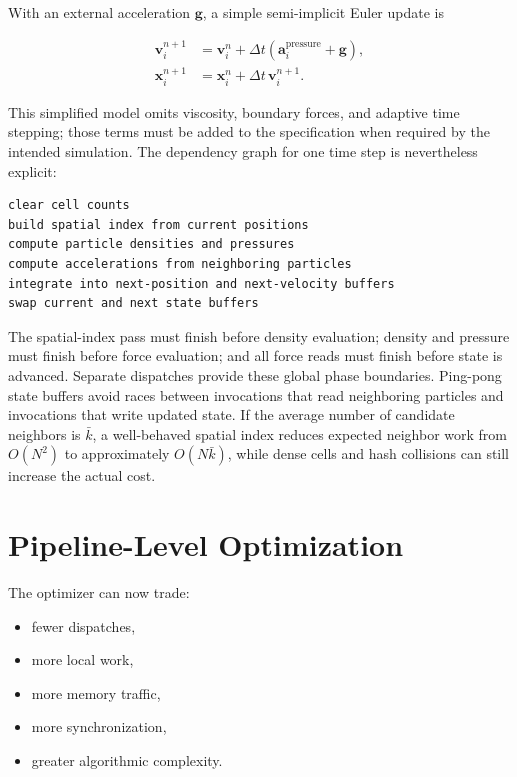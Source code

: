 \documentclass[11pt,a4paper,oneside]{report}
\begin{document}
With an external acceleration $\mathbf{g}$, a simple semi-implicit Euler update is

\begin{align}
\mathbf{v}_i^{n+1}&=\mathbf{v}_i^n+\Delta t
\left(\mathbf{a}_i^{\mathrm{pressure}}+\mathbf{g}\right),\\
\mathbf{x}_i^{n+1}&=\mathbf{x}_i^n+\Delta t\,\mathbf{v}_i^{n+1}.
\end{align}

This simplified model omits viscosity, boundary forces, and adaptive time stepping; those terms
must be added to the specification when required by the intended simulation. The dependency graph
for one time step is nevertheless explicit:

\begin{lstlisting}[caption={Conceptual pass sequence for one SPH time step.}]
clear cell counts
build spatial index from current positions
compute particle densities and pressures
compute accelerations from neighboring particles
integrate into next-position and next-velocity buffers
swap current and next state buffers
\end{lstlisting}

The spatial-index pass must finish before density evaluation; density and pressure must finish
before force evaluation; and all force reads must finish before state is advanced. Separate
dispatches provide these global phase boundaries. Ping-pong state buffers avoid races between
invocations that read neighboring particles and invocations that write updated state. If the
average number of candidate neighbors is $\bar{k}$, a well-behaved spatial index reduces expected
neighbor work from $O(N^2)$ to approximately $O(N\bar{k})$, while dense cells and hash collisions
can still increase the actual cost.

\section{Pipeline-Level Optimization}

The optimizer can now trade:

\begin{itemize}
  \item fewer dispatches,
  \item more local work,
  \item more memory traffic,
  \item more synchronization,
  \item greater algorithmic complexity.
\end{itemize}
\end{document}
